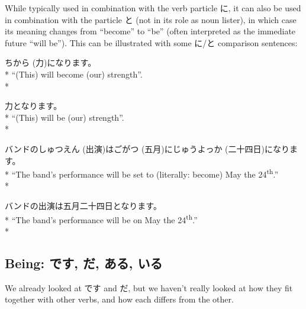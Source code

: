 \documentclass[11pt, b5paper, twoside, openright, onecolumn]{book}
\makeatletter
\newcommand*{\rubystack}[2]{{\relscale{0.5}%
  \begin{tabular}[b]{@{}c@{}}%
    {#1}\\%
   {\textscale{2}{#2}}%
  \end{tabular}}%
}
\DeclareRobustCommand*{\ruby}[2]{%
  \mbox{%
    \setlength{\parskip}{0ex}%
    \BeginAccSupp{method=pdfstringdef,ActualText={#1}}%
      \rubystack{\phantom{#2}}{#1}%
      \llap{%
        \rubystack{#2}{\phantom{#1}}%
      }%
    \EndAccSupp{}%
  }%
}
\renewcommand*{\ruby}[2]{#2 (#1)}%
\newenvironment{exampleblock}{
\setlength{\parindent}{0.6in}
\begin{minipage}[t]{\dimexpr\textwidth-\parindent}}
{\end{minipage}}
\makeatother
\begin{document}
While typically used in combination with the verb particle に‚ it can also be used in combination with the particle と (not in its role as noun lister)‚ in which case its meaning changes from “become” to “be” (often interpreted as the immediate future “will be”). This can be illustrated with some に/と comparison sentences:

\vspace{0.4cm}
\begin{exampleblock}
\ruby{力}{ちから}になります。 \\* 
“(This) will become (our) strength”. \\* 
\end{exampleblock}
\vspace{0.2cm}

\begin{exampleblock}
力となります。 \\* 
“(This) will be (our) strength”. \\* 
\end{exampleblock}
\vspace{0.2cm}

\begin{exampleblock}
バンドの\ruby{出演}{しゅつえん}は\ruby{五月}{ごがつ}\ruby{二十四日}{にじゅうよっか}になります。 \\* 
“The band’s performance will be set to (literally: become) May the 24\textsuperscript{th}.” \\* 
\end{exampleblock}
\vspace{0.2cm}

\begin{exampleblock}
バンドの出演は五月二十四日となります。 \\* 
“The band’s performance will be on May the 24\textsuperscript{th}.” \\* 
\end{exampleblock}
\subsection{Being: です‚ だ‚ ある‚ いる}


We already looked at です and だ‚ but we haven’t really looked at how they fit together with other  verbs‚ and how each differs from the other.
\end{document}
